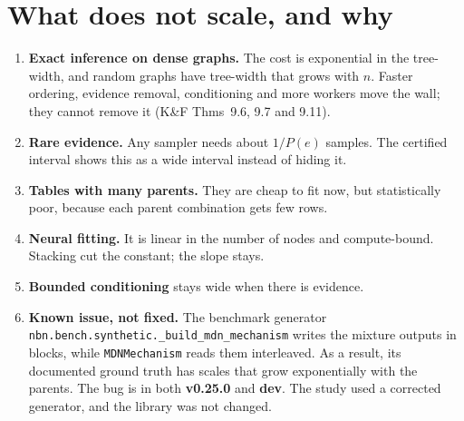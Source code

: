 \documentclass[10pt,a4paper]{article}
\newcommand{\code}[1]{\texttt{#1}}
\newcommand{\old}{\textbf{v0.25.0}}
\newcommand{\new}{\textbf{dev}}
\begin{document}
\section{What does not scale, and why}
\begin{enumerate}
\item \textbf{Exact inference on dense graphs.} The cost is exponential in the tree-width, and
random graphs have tree-width that grows with $n$. Faster ordering, evidence removal,
conditioning and more workers move the wall; they cannot remove it (K\&F Thms~9.6, 9.7 and 9.11).
\item \textbf{Rare evidence.} Any sampler needs about $1/P(e)$ samples. The certified interval
shows this as a wide interval instead of hiding it.
\item \textbf{Tables with many parents.} They are cheap to fit now, but statistically poor,
because each parent combination gets few rows.
\item \textbf{Neural fitting.} It is linear in the number of nodes and compute-bound. Stacking
cut the constant; the slope stays.
\item \textbf{Bounded conditioning} stays wide when there is evidence.
\item \textbf{Known issue, not fixed.} The benchmark generator
\code{nbn.bench.synthetic.\_build\_mdn\_mechanism} writes the mixture outputs in blocks, while
\code{MDNMechanism} reads them interleaved. As a result, its documented ground truth has scales
that grow exponentially with the parents. The bug is in both \old{} and \new. The study used a
corrected generator, and the library was not changed.
\end{enumerate}

\end{document}
